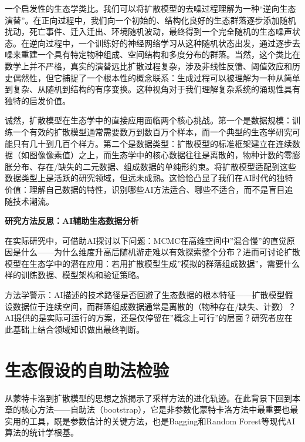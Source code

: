 \documentclass[
  twoside,12pt,fontset=none]{ctexbook}
\renewenvironment{quote}{%
  \def\FrameCommand{{\color{quote-border}\vrule width 4pt}\hspace{10pt}}%
  \MakeFramed {\advance\hsize-\width \FrameRestore\noindent\ignorespaces}%
}{%
  \endMakeFramed
}
\begin{document}
一个启发性的生态学类比。我们可以将扩散模型的去噪过程理解为一种``逆向生态演替''。在正向过程中，我们向一个初始的、结构化良好的生态群落逐步添加随机扰动，死亡事件、迁入迁出、环境随机波动，最终得到一个完全随机的生态噪声状态。在逆向过程中，一个训练好的神经网络学习从这种随机状态出发，通过逐步去噪来重建一个具有特定物种组成、空间结构和多度分布的群落。当然，这个类比在数学上并不严格，真实的演替远比扩散过程复杂，涉及非线性反馈、阈值效应和历史偶然性，但它捕捉了一个根本性的概念联系：生成过程可以被理解为一种从简单到复杂、从随机到结构的有序变换。这种视角对于我们理解复杂系统的涌现性具有独特的启发价值。

诚然，扩散模型在生态学中的直接应用面临两个核心挑战。第一个是数据规模：训练一个有效的扩散模型通常需要数万到数百万个样本，而一个典型的生态学研究可能只有几十到几百个样方。第二个是数据类型：扩散模型的标准框架建立在连续数据（如图像像素值）之上，而生态学中的核心数据往往是离散的，物种计数的零膨胀分布、存在/缺失的二元数据、组成数据的单纯形约束。将扩散模型适配到这些数据类型上是活跃的研究领域，但远未成熟。这恰恰凸显了我们在AI时代的独特价值：理解自己数据的特性，识别哪些AI方法适合、哪些不适合，而不是盲目追随技术潮流。

\begin{quote}
\textbf{研究方法反思：AI辅助生态数据分析}

在实际研究中，可借助AI探讨以下问题：MCMC在高维空间中''混合慢''的直觉原因是什么------为什么维度升高后随机游走难以有效探索整个分布？进而可讨论扩散模型在生态学中的潜在应用：若用扩散模型生成''模拟的群落组成数据''，需要什么样的训练数据、模型架构和验证策略。

方法学警示：AI描述的技术路径是否回避了生态数据的根本特征------扩散模型假设数据位于连续空间，而群落组成数据通常是离散的（物种存在/缺失、计数）？AI提供的是实际可运行的方案，还是仅停留在''概念上可行''的层面？研究者应在此基础上结合领域知识做出最终判断。
\end{quote}

\hypertarget{ux751fux6001ux5047ux8bbeux7684ux81eaux52a9ux6cd5ux68c0ux9a8c}{%
\section{生态假设的自助法检验}\label{ux751fux6001ux5047ux8bbeux7684ux81eaux52a9ux6cd5ux68c0ux9a8c}}

从蒙特卡洛到扩散模型的思想之旅揭示了采样方法的进化轨迹。在此背景下回到本章的核心方法------自助法（bootstrap），它是非参数化蒙特卡洛方法中最重要也最实用的工具，既是参数估计的关键方法，也是Bagging和Random Forest等现代AI算法的统计学根基。
\end{document}
